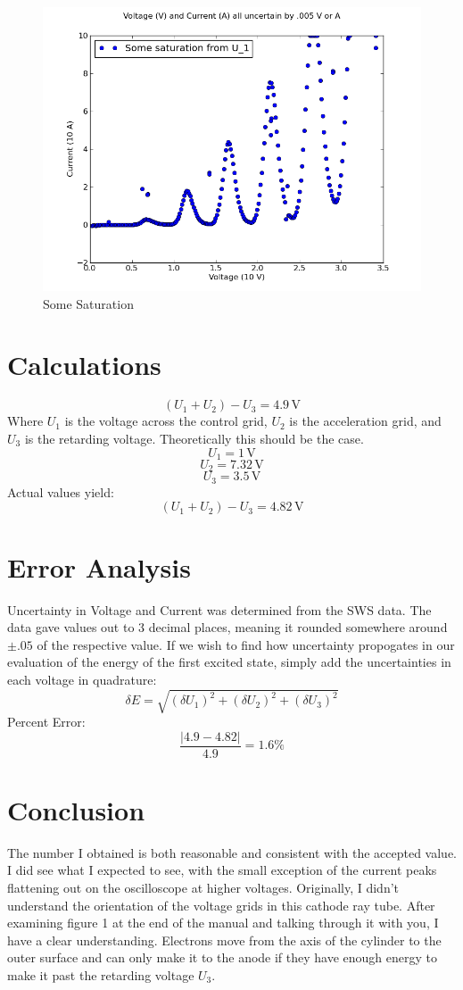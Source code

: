\documentclass[12pt]{article}
\newcommand{\V}{\text{V}}
\begin{document}
\begin{figure}[H]
\centering
\hspace{-0.0in}\includegraphics[scale=0.60]{Plot2.png}
\caption{Some Saturation \label{fig:setup}}
\end{figure}

\section{Calculations}
\indent \indent
\[(U_1 + U_2) - U_3 = 4.9 \,\V\]
Where $U_1$ is the voltage across the control grid, $U_2$ is the acceleration grid, and $U_3$ is the retarding voltage. Theoretically this should be the case.
\[ U_1 = 1 \, \V \]
\[U_2 = 7.32 \, \V \]
\[ U_3 = 3.5 \, \V \]
Actual values yield:
\[(U_1 + U_2) - U_3 = 4.82 \,\V\]

\section{Error Analysis}
\indent \indent Uncertainty in Voltage and Current was determined from the SWS data. The data gave values out to 3 decimal places, meaning it rounded somewhere around $\pm .05$ of the respective value. If we wish to find how uncertainty propogates in our evaluation of the energy of the first excited state, simply add the uncertainties in each voltage in quadrature:
\[\delta E = \sqrt{(\delta U_1)^2 + (\delta U_2)^2 + (\delta U_3)^2} \]
Percent Error:
\[\frac{|4.9 - 4.82|}{4.9} = 1.6 \% \]

\section{Conclusion}
\indent \indent The number I obtained is both reasonable and consistent with the accepted value. I did see what I expected to see, with the small exception of the current peaks flattening out on the oscilloscope at higher voltages. Originally, I didn't understand the orientation of the voltage grids in this cathode ray tube. After examining figure 1 at the end of the manual and talking through it with you, I have a clear understanding. Electrons move from the axis of the cylinder to the outer surface and can only make it to the anode if they have enough energy to make it past the retarding voltage $U_3$.
\end{document}

